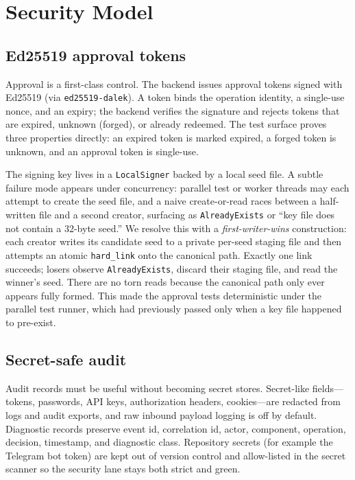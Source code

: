 \documentclass[conference]{IEEEtran}
\begin{document}
\section{Security Model}
\label{sec:sec}

\subsection{Ed25519 approval tokens}
Approval is a first-class control. The backend issues approval tokens signed
with Ed25519 (via \texttt{ed25519-dalek}). A token binds the operation
identity, a single-use nonce, and an expiry; the backend verifies the signature
and rejects tokens that are expired, unknown (forged), or already redeemed. The
test surface proves three properties directly: an expired token is marked
expired, a forged token is unknown, and an approval token is single-use.

The signing key lives in a \texttt{LocalSigner} backed by a local seed file. A
subtle failure mode appears under concurrency: parallel test or worker threads
may each attempt to create the seed file, and a naive create-or-read races
between a half-written file and a second creator, surfacing as
\texttt{AlreadyExists} or ``key file does not contain a 32-byte seed.'' We
resolve this with a \emph{first-writer-wins} construction: each creator writes
its candidate seed to a private per-seed staging file and then attempts an
atomic \texttt{hard\_link} onto the canonical path. Exactly one link succeeds;
losers observe \texttt{AlreadyExists}, discard their staging file, and read the
winner's seed. There are no torn reads because the canonical path only ever
appears fully formed. This made the approval tests deterministic under the
parallel test runner, which had previously passed only when a key file happened
to pre-exist.

\subsection{Secret-safe audit}
Audit records must be useful without becoming secret stores. Secret-like
fields---tokens, passwords, API keys, authorization headers, cookies---are
redacted from logs and audit exports, and raw inbound payload logging is off by
default. Diagnostic records preserve event id, correlation id, actor,
component, operation, decision, timestamp, and diagnostic class. Repository
secrets (for example the Telegram bot token) are kept out of version control
and allow-listed in the secret scanner so the security lane stays both strict
and green.
\end{document}
